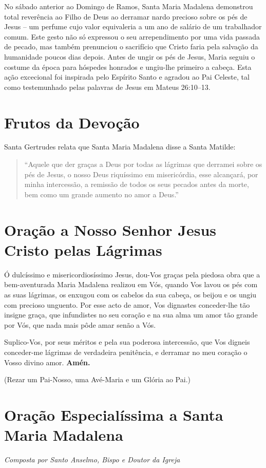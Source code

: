 \documentclass[a4paper,12pt]{extarticle}
\begin{document}
No sábado anterior ao Domingo de Ramos, Santa Maria Madalena demonstrou total reverência ao Filho de Deus ao derramar nardo precioso sobre os pés de Jesus – um perfume cujo valor equivaleria a um ano de salário de um trabalhador comum. Este gesto não só expressou o seu arrependimento por uma vida passada de pecado, mas também prenunciou o sacrifício que Cristo faria pela salvação da humanidade poucos dias depois. Antes de ungir os pés de Jesus, Maria seguiu o costume da época para hóspedes honrados e ungiu-lhe primeiro a cabeça. Esta ação excecional foi inspirada pelo Espírito Santo e agradou ao Pai Celeste, tal como testemunhado pelas palavras de Jesus em Mateus 26:10–13.

\section{Frutos da Devoção}
Santa Gertrudes relata que Santa Maria Madalena disse a Santa Matilde:

\begin{quote}
“Aquele que der graças a Deus por todas as lágrimas que derramei sobre os pés de Jesus, o nosso Deus riquíssimo em misericórdia, esse alcançará, por minha intercessão, a remissão de todos os seus pecados antes da morte, bem como um grande aumento no amor a Deus.”
\end{quote}

\section{Oração a Nosso Senhor Jesus Cristo pelas Lágrimas}
Ó dulcíssimo e misericordiosíssimo Jesus, dou-Vos graças pela piedosa obra que a bem-aventurada Maria Madalena realizou em Vós, quando Vos lavou os pés com as suas lágrimas, os enxugou com os cabelos da sua cabeça, os beijou e os ungiu com precioso unguento. Por esse acto de amor, Vos dignastes conceder-lhe tão insigne graça, que infundistes no seu coração e na sua alma um amor tão grande por Vós, que nada mais pôde amar senão a Vós.

Suplico-Vos, por seus méritos e pela sua poderosa intercessão, que Vos digneis conceder-me lágrimas de verdadeira penitência, e derramar no meu coração o Vosso divino amor. \textbf{Amén.}

(Rezar um Pai-Nosso, uma Avé-Maria e um Glória ao Pai.)

\section{Oração Especialíssima a Santa Maria Madalena}
\textit{Composta por Santo Anselmo, Bispo e Doutor da Igreja}
\end{document}
